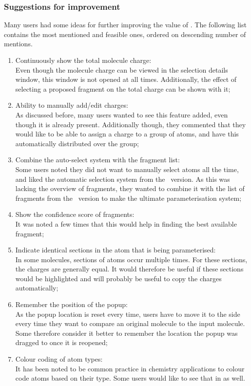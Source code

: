 \subsubsection{Suggestions for improvement}
Many users had some ideas for further improving the value of \oframp. The following list contains the most mentioned and feasible ones, ordered on descending number of mentions.
\begin{enumerate}
\item Continuously show the total molecule charge:\\
Even though the molecule charge can be viewed in the selection details window, this window is not opened at all times. Additionally, the effect of selecting a proposed fragment on the total charge can be shown with it;
\item Ability to manually add/edit charges:\\
As discussed before, many users wanted to see this feature added, even though it is already present. Additionally though, they commented that they would like to be able to assign a charge to a group of atoms, and have this automatically distributed over the group;
\item Combine the auto-select system with the fragment list:\\
Some users noted they did not want to manually select atoms all the time, and liked the automatic selection system from the \IDb\ version. As this was lacking the overview of fragments, they wanted to combine it with the list of fragments from the \IDa\ version to make the ultimate parameterisation system;
\item Show the confidence score of fragments:\\
It was noted a few times that this would help in finding the best available fragment;
\item Indicate identical sections in the atom that is being parameterised:\\
In some molecules, sections of atoms occur multiple times. For these sections, the charges are generally equal. It would therefore be useful if these sections would be highlighted and will probably be useful to copy the charges automatically;
\item Remember the position of the popup:\\
As the popup location is reset every time, users have to move it to the side every time they want to compare an original molecule to the input molecule. Some therefore consider it better to remember the location the popup was dragged to once it is reopened;
\item Colour coding of atom types:\\
It has been noted to be common practice in chemistry applications to colour code atoms based on their type. Some users would like to see that in \oframp{} as well.
\end{enumerate}
